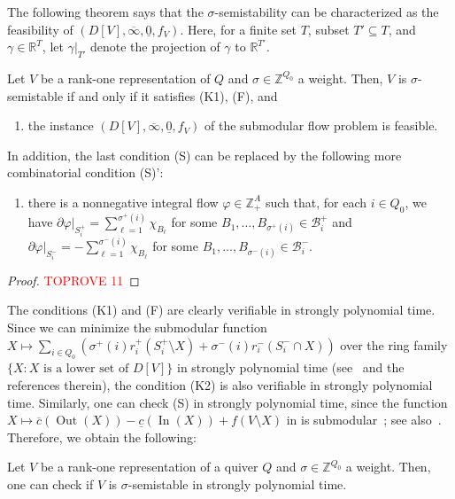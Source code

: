 \documentclass[a4paper,11pt]{article}
\numberwithin{equation}{section}
\newcommand{\R}{\mathbb{R}}
\newcommand{\Z}{\mathbb{Z}}
\DeclareMathOperator{\In}{In}
\DeclareMathOperator{\Out}{Out}
\begin{document}
The following theorem says that the $\sigma$-semistability can be characterized as the feasibility of $(D[V], \overline{\infty}, \underline{0}, f_V)$.
Here, for a finite set $T$, subset $T' \subseteq T$, and $\gamma \in \R^T$,
let $\gamma|_{T'}$ denote the projection of $\gamma$ to $\R^{T'}$.
\begin{theorem}\label{thm:submodular-flow}
Let $V$ be a rank-one representation of $Q$ and $\sigma \in \Z^{Q_0}$ a weight.
Then, $V$ is $\sigma$-semistable if and only if it satisfies {\rm (K1)}, {\rm (F)}, and
\begin{enumerate}[{label={\upshape{(S)}}}]
    \item the instance $(D[V], \overline{\infty}, \underline{0}, f_V)$ of the submodular flow problem is feasible.
\end{enumerate}
In addition, the last condition {\rm (S)} can be replaced by the following more combinatorial condition {\rm (S)'}:
\begin{enumerate}[{label={\upshape{(S)'}}}]
    \item there is a nonnegative integral flow $\varphi \in \Z_+^A$ such that, for each $i \in Q_0$, we have
    $\partial \varphi|_{S_i^+} = \sum_{\ell = 1}^{\sigma^+(i)} \chi_{B_\ell}$ for some $B_1, \dots, B_{\sigma^+(i)} \in \mathcal{B}_i^+$ and $\partial \varphi|_{S_i^-} = - \sum_{\ell = 1}^{\sigma^-(i)} \chi_{B_\ell}$ for some $B_1, \dots, B_{\sigma^-(i)} \in \mathcal{B}_i^-$.
\end{enumerate}
\end{theorem}
\begin{proof}\textcolor{red}{TOPROVE 11}\end{proof}



The conditions (K1) and (F) are clearly verifiable in strongly polynomial time.
Since we can minimize the submodular function $X \mapsto \sum_{i \in Q_0}\left( \sigma^+(i) r_i^+(S_i^+ \setminus X) + \sigma^-(i) r_i^-(S_i^- \cap X) \right)$ over the ring family $\{ X : \text{$X$ is a lower set of $D[V]$} \}$ in strongly polynomial time (see~\cite{Jiang2021} and the references therein),
the condition (K2) is also verifiable in strongly polynomial time.
Similarly, one can check (S) in strongly polynomial time,
since the function $X \mapsto \overline{c}(\Out(X)) - \underline{c}(\In(X)) + f(V \setminus X)$ in  is submodular~\cite[Section~2.3]{Fujishige2005}; see also~\cite{Frank1984}.
Therefore, we obtain the following:
\begin{theorem}\label{thm:rank-one:poly}
    Let $V$ be a rank-one representation of a quiver $Q$ and $\sigma \in \Z^{Q_0}$ a weight.
    Then, one can check if $V$ is $\sigma$-semistable in strongly polynomial time.
\end{theorem}
\end{document}
